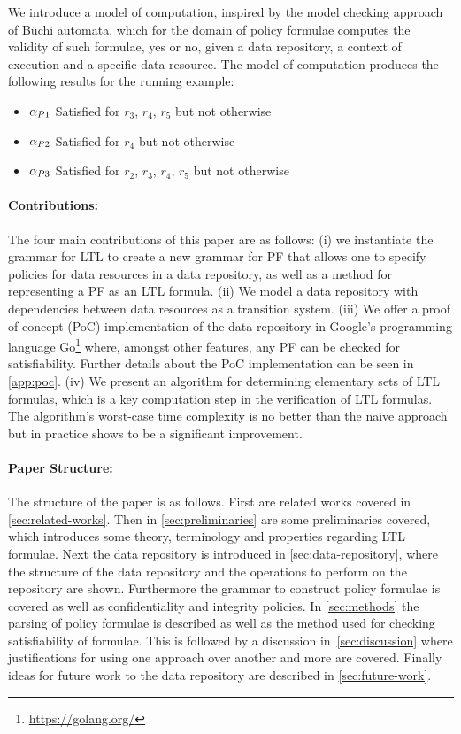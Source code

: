 We introduce a model of computation, inspired by the model checking approach of Büchi automata, which for the domain of policy formulae computes the validity of such formulae, yes or no, given a data repository, a context of execution and a specific data resource. The model of computation produces the following results for the running example:
\begin{itemize}
    \item $\alpha_{P1}$ Satisfied for $r_3$, $r_4$, $r_5$ but not otherwise
    \item $\alpha_{P2}$ Satisfied for $r_4$ but not otherwise
    \item $\alpha_{P3}$ Satisfied for $r_2$, $r_3$, $r_4$, $r_5$ but not otherwise
\end{itemize}

\paragraph{Contributions:} The four main contributions of this paper are as follows: (i) we instantiate the grammar for LTL to create a new grammar for PF that allows one to specify policies for data resources in a data repository, as well as a method for representing a PF as an LTL formula. (ii) We model a data repository with dependencies between data resources as a transition system. (iii) We offer a proof of concept (PoC) implementation of the data repository in Google's programming language Go\footnote{\href{https://golang.org/}{https://golang.org/}} where, amongst other features, any PF can be checked for satisfiability. Further details about the PoC implementation can be seen in \autoref{app:poc}. (iv) We present an algorithm for determining elementary sets of LTL formulas, which is a key computation step in the verification of LTL formulas. The algorithm's worst-case time complexity is no better than the naive approach but in practice shows to be a significant improvement.

\paragraph{Paper Structure:}
The structure of the paper is as follows. First are related works covered in \autoref{sec:related-works}. Then in \autoref{sec:preliminaries} are some preliminaries covered, which introduces some theory, terminology and properties regarding LTL formulae. Next the data repository is introduced in \autoref{sec:data-repository}, where the structure of the data repository and the operations to perform on the repository are shown. Furthermore the grammar to construct policy formulae is covered as well as confidentiality and integrity policies. In \autoref{sec:methods} the parsing of policy formulae is described as well as the method used for checking satisfiability of formulae. This is followed by a discussion in~\autoref{sec:discussion} where justifications for using one approach over another and more are covered. Finally ideas for future work to the data repository are described in \autoref{sec:future-work}.